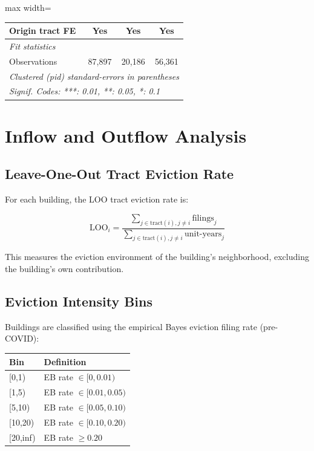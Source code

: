 \documentclass[
  11pt,
]{article}
\begin{document}
\begin{table}[htbp]
\begin{adjustbox}{max width=\textwidth}
\begin{tabular}{lccc}
      Origin tract FE                      & Yes            & Yes             & Yes\\  
      \midrule
      \emph{Fit statistics}\\
      Observations                         & 87,897         & 20,186          & 56,361\\  
      \midrule \midrule
      \multicolumn{4}{l}{\emph{Clustered (pid) standard-errors in parentheses}}\\
      \multicolumn{4}{l}{\emph{Signif. Codes: ***: 0.01, **: 0.05, *: 0.1}}\\
   \end{tabular}

\end{adjustbox}
\end{table}

\section{Inflow and Outflow Analysis}\label{inflow-and-outflow-analysis}

\subsection{Leave-One-Out Tract Eviction
Rate}\label{leave-one-out-tract-eviction-rate}

For each building, the LOO tract eviction rate is:

\[
\text{LOO}_{i} = \frac{\sum_{j \in \text{tract}(i), j \neq i} \text{filings}_{j}}{\sum_{j \in \text{tract}(i), j \neq i} \text{unit-years}_{j}}
\]

This measures the eviction environment of the building's neighborhood,
excluding the building's own contribution.

\subsection{Eviction Intensity Bins}\label{eviction-intensity-bins}

Buildings are classified using the empirical Bayes eviction filing rate
(pre-COVID):

\begin{longtable}[]{@{}ll@{}}
\toprule\noalign{}
Bin & Definition \\
\midrule\noalign{}
\endhead
\bottomrule\noalign{}
\endlastfoot
{[}0,1) & EB rate \(\in [0, 0.01)\) \\
{[}1,5) & EB rate \(\in [0.01, 0.05)\) \\
{[}5,10) & EB rate \(\in [0.05, 0.10)\) \\
{[}10,20) & EB rate \(\in [0.10, 0.20)\) \\
{[}20,inf) & EB rate \(\ge 0.20\) \\
\end{longtable}
\end{document}
